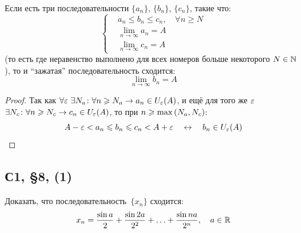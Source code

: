 \documentclass[a4paper,12pt]{article}
\begin{document}
  \begin{proposition}
    Если есть три последовательности $\{a_n\}$, $\{b_n\}$, $\{c_n\}$, такие что:
    \[
      \left\{
        \begin{aligned}
          &a_n \leq b_n \leq c_n,\quad \forall n \geq N\\
          &\lim_{n\to \infty} a_n = A\\
          &\lim_{n\to \infty} c_n = A
        \end{aligned}
      \right.
    \]
    (то есть где неравенство выполнено для всех номеров больше некоторого $N \hm\in \NN$), то и ``зажатая'' последовательность сходится:
    \[
      \lim_{n\to \infty} b_n = A
    \]
  \end{proposition}
  
  \begin{proof}
    Так как $\forall \eps\ \exists N_a\colon \forall n \hm\geq N_a \hm\to a_n \hm\in U_{\eps}(A)$, и ещё для того же $\varepsilon$ $\exists N_c\colon \forall n \hm\geq N_c \hm\to c_n \hm\in U_{\eps}(A)$, то при $n \hm\geq \max{(N_a, N_c)}$:
    \[
      A - \varepsilon < a_n \leqslant b_n \leqslant c_n < A + \varepsilon
      \quad\leftrightarrow\quad b_n \in U_{\varepsilon}(A)
    \]
  \end{proof}
  
  
  \subsection{С1, \S 8, (1)}
  
  Доказать, что последовательность~$\{x_n\}$ сходится:
  \[
    x_n = \frac{\sin a}{2} + \frac{\sin{2a}}{2^2} + \ldots + \frac{\sin{na}}{2^n},\quad a \in \operatorname{\mathbb R}
  \]
  
\end{document}
